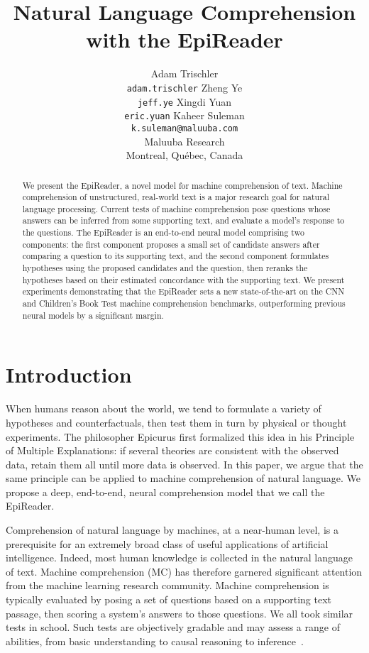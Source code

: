 \documentclass[11pt,letterpaper]{article}
\title{Natural Language Comprehension with the EpiReader}
\author{Adam Trischler \\ {\tt adam.trischler} \And Zheng Ye \\ {\tt jeff.ye} \And Xingdi Yuan \\ {\tt eric.yuan} \AND
        Kaheer Suleman \\ {\tt k.suleman@maluuba.com} \\ Maluuba Research \\ Montreal, Qu\'{e}bec, Canada }
\begin{document}
\maketitle

\begin{abstract}
  We present the EpiReader, a novel model for machine comprehension of text. Machine comprehension of unstructured, real-world text is a major research goal for natural language processing. Current tests of machine comprehension pose questions whose answers can be inferred from some supporting text, and evaluate a model's response to the questions. The EpiReader is an end-to-end neural model comprising two components: the first component proposes a small set of candidate answers after comparing a question to its supporting text, and the second component formulates hypotheses using the proposed candidates and the question, then reranks the hypotheses based on their estimated concordance with the supporting text. We present experiments demonstrating that the EpiReader sets a new state-of-the-art on the CNN and Children's Book Test machine comprehension benchmarks, outperforming previous neural models by a significant margin.
\end{abstract}

\section{Introduction}
When humans reason about the world, we tend to formulate a variety of hypotheses and counterfactuals, then test them in turn by physical or thought experiments. The philosopher Epicurus first formalized this idea in his Principle of Multiple Explanations: if several theories are consistent with the observed data, retain them all until more data is observed. In this paper, we argue that the same principle can be applied to machine comprehension of natural language. We propose a deep, end-to-end, neural comprehension model that we call the EpiReader.

Comprehension of natural language by machines, at a near-human level, is a prerequisite for an extremely broad class of useful applications of artificial intelligence. Indeed, most human knowledge is collected in the natural language of text. Machine comprehension (MC) has therefore garnered significant attention from the machine learning research community. Machine comprehension is typically evaluated by posing a set of questions based on a supporting text passage, then scoring a system's answers to those questions. We all took similar tests in school. Such tests are objectively gradable and may assess a range of abilities, from basic understanding to causal reasoning to inference~\cite{richardson2013}.
\end{document}
